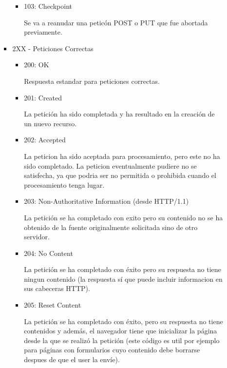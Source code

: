 \documentclass[a4paper,10pt]{article}
\begin{document}
\begin{enumerate}
\begin{enumerate}
\begin{itemize}
\begin{itemize}
                            \item 103: Checkpoint

                            Se va a reanudar una peticón POST o PUT que fue abortada previamente.
                        \end{itemize}

                    \item 2XX - Peticiones Correctas
                        \begin{itemize}
                            \item 200: OK

                            Respuesta estandar para peticiones correctas.

                            \item 201: Created

                            La petición ha sido completada y ha resultado en la creación de un nuevo recurso.

                            \item 202: Accepted

                            La peticion ha sido aceptada para procesamiento, pero este no ha sido completado. La peticion eventualmente pudiere no se satisfecha, ya que podria ser no permitida o prohibida cuando el procesamiento tenga lugar.

                            \item 203: Non-Authoritative Information (desde HTTP/1.1)

                            La petición se ha completado con exito pero su contenido no se ha obtenido de la fuente originalmente solicitada sino de otro servidor.

                            \item 204: No Content

                            La petición se ha completado con éxito pero su respuesta no tiene ningun contenido (la respuesta sí que puede incluir informacion en sus cabeceras HTTP).

                            \item 205: Reset Content

                            La petición se ha completado con éxito, pero su respuesta no tiene contenidos y además, el navegador tiene que inicializar la página desde la que se realizó la petición (este código es util por ejemplo para páginas con formularios cuyo contenido debe borrarse despues de que el user la envíe).


\end{itemize}
\end{itemize}
\end{enumerate}
\end{enumerate}
\end{document}
